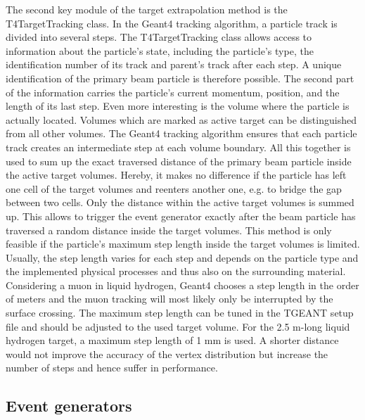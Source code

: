 The second key module of the target extrapolation method is the T4TargetTracking class. In the Geant4 tracking algorithm, a particle track is divided into several steps. The T4TargetTracking class allows access to information about the particle’s state, including the particle’s type, the identification number of its track and parent’s track after each step. A unique identification of the primary beam particle is therefore possible. The second part of the information carries the particle’s current momentum, position, and the length of its last step. Even more interesting is the volume where the particle is actually located. Volumes which are marked as active target can be distinguished from all other volumes. The Geant4 tracking algorithm ensures that each particle track creates an intermediate step at each volume boundary. All this together is used to sum up the exact traversed distance of the primary beam particle inside the active target volumes. Hereby, it makes no difference if the particle has left one cell of the target volumes and reenters another one, e.g. to bridge the gap between two cells. Only the distance within the active target volumes is summed up. This allows to trigger the event generator exactly after the beam particle has traversed a random distance inside the target volumes. This method is only feasible if the particle’s maximum step length inside the target volumes is limited. Usually, the step length varies for each step and depends on the particle type and the implemented physical processes and thus also on the surrounding material. Considering a muon in liquid hydrogen, Geant4 chooses a step length in the order of meters and the muon tracking will most likely only be interrupted by the surface crossing. The maximum step length can be tuned in the TGEANT setup file and should be adjusted to the used target volume. For the 2.5 m-long liquid hydrogen target, a maximum step length of 1 mm is used. A shorter distance would not improve the accuracy of the vertex distribution but increase the number of steps and hence suffer in performance.

\subsection{Event generators}

